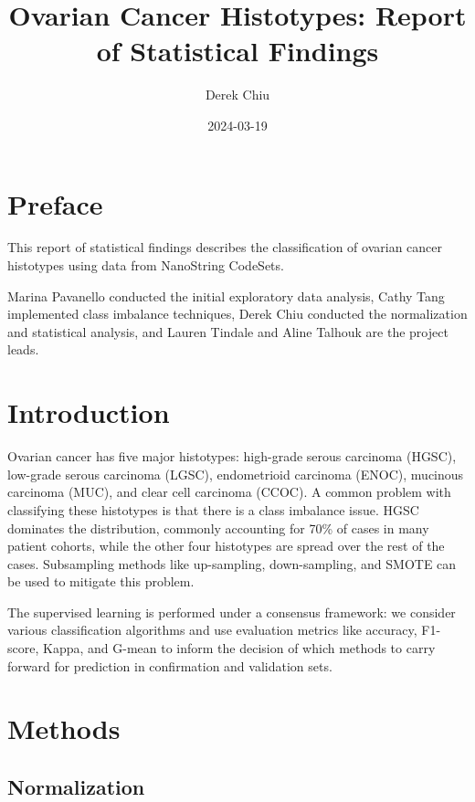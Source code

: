 \documentclass[
]{report}
\title{Ovarian Cancer Histotypes: Report of Statistical Findings}
\author{Derek Chiu}
\date{2024-03-19}
\begin{document}
\maketitle

{
\hypersetup{linkcolor=}
\setcounter{tocdepth}{1}
\tableofcontents
}
\listoffigures
\listoftables
\hypertarget{preface}{%
\chapter*{Preface}\label{preface}}

This report of statistical findings describes the classification of ovarian cancer histotypes using data from NanoString CodeSets.

Marina Pavanello conducted the initial exploratory data analysis, Cathy Tang implemented class imbalance techniques, Derek Chiu conducted the normalization and statistical analysis, and Lauren Tindale and Aline Talhouk are the project leads.

\hypertarget{introduction}{%
\chapter{Introduction}\label{introduction}}

Ovarian cancer has five major histotypes: high-grade serous carcinoma (HGSC), low-grade serous carcinoma (LGSC), endometrioid carcinoma (ENOC), mucinous carcinoma (MUC), and clear cell carcinoma (CCOC). A common problem with classifying these histotypes is that there is a class imbalance issue. HGSC dominates the distribution, commonly accounting for 70\% of cases in many patient cohorts, while the other four histotypes are spread over the rest of the cases. Subsampling methods like up-sampling, down-sampling, and SMOTE can be used to mitigate this problem.

The supervised learning is performed under a consensus framework: we consider various classification algorithms and use evaluation metrics like accuracy, F1-score, Kappa, and G-mean to inform the decision of which methods to carry forward for prediction in confirmation and validation sets.

\hypertarget{methods}{%
\chapter{Methods}\label{methods}}

\hypertarget{normalization}{%
\section{Normalization}\label{normalization}}
\end{document}
